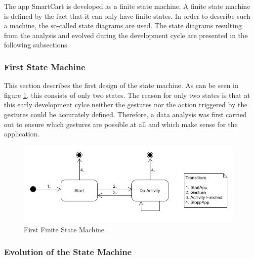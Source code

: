 The app SmartCart is developed as a finite state machine. A finite state machine
is defined by the fact that it can only have finite states. In order to describe
such a machine, the so-called state diagrams are used. The state diagrams
resulting from the analysis and evolved during the development cycle are
presented in the following subsections.

\subsubsection{First State Machine}

This section describes the first design of the state machine. As can be seen in
figure \ref{fig:first state machine}, this consists of only two states. The
reason for only two states is that at this early development cylce neither the
gestures nor the action triggered by the gestures could be accurately defined.
Therefore, a data analysis was first carried out to ensure which gestures are
possible at all and which make sense for the application.

\begin{figure}
\centering
\captionsetup{justification=centering}
\includegraphics[width=\textwidth]{res/sa/PresentationStateMachineOld.png}
\caption{First Finite State Machine}
\label{fig:first state machine}
\end{figure}

\subsubsection{Evolution of the State Machine}

